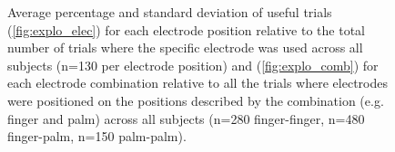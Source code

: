\documentclass[10pt]{iopart}
\begin{document}
\begin{figure}
    \centering
    \caption{Average percentage and standard deviation of useful trials (\ref{fig:explo_elec}) for each electrode position relative to the total number of trials where the specific electrode was used across all subjects (n=130 per electrode position) and (\ref{fig:explo_comb}) for each electrode combination relative to all the trials where electrodes were positioned on the positions described by the combination (e.g. finger and palm) across all subjects (n=280 finger-finger, n=480 finger-palm, n=150 palm-palm).}
    \label{fig:explo_elec_comb}
\end{figure}
\end{document}
